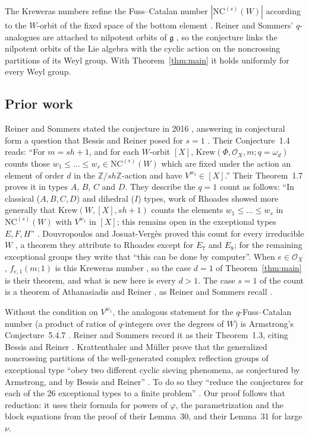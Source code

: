 \documentclass[11pt]{article}
\theoremstyle{definition}
\newcommand{\NC}{\mathrm{NC}}
\newcommand{\Krew}{\mathrm{Krew}}
\newcommand{\Z}{\mathbb{Z}}
\newcommand{\Oc}{\mathcal{O}}
\begin{document}
The Kreweras numbers refine the Fuss--Catalan number $|\NC^{(s)}(W)|$
according to the $W$-orbit of the fixed space of the bottom element
\cite[\S1.1]{RS}. Reiner and Sommers' $q$-analogues are attached to
nilpotent orbits of $\mathfrak g$ \cite[\S1.3]{RS}, so the conjecture links
the nilpotent orbits of the Lie algebra with the cyclic action on the
noncrossing partitions of its Weyl group. With Theorem~\ref{thm:main} it
holds uniformly for every Weyl group.

\subsection{Prior work}

Reiner and Sommers stated the conjecture in 2016 \cite{RS}, answering in
conjectural form a question that Bessis and Reiner posed for $s=1$
\cite[\S6.1, Question~6.3]{BR}. Their Conjecture~1.4 reads: ``For $m=sh+1$, and for each $W$-orbit $[X]$,
$\Krew(\Phi,\Oc_X,m;q=\omega_d)$ counts those $w_1\le\dots\le w_s\in
\NC^{(s)}(W)$ which are fixed under the action an element of order $d$ in
the $\Z/sh\Z$-action and have $V^{w_1}\in[X]$.'' Their Theorem~1.7 proves it
in types $A$, $B$, $C$ and $D$. They describe the $q=1$ count as follows:
``In classical ($A,B,C,D$) and dihedral ($I$) types, work of Rhoades showed
more generally that $\Krew(W,[X],sh+1)$ counts the elements
$w_1\le\dots\le w_s$ in $\NC^{(s)}(W)$ with $V^{w_1}$ in $[X]$; this remains
open in the exceptional types $E,F,H$'' \cite[\S1.1]{RS}. Douvropoulos and
Josuat-Vergès proved this count for every irreducible $W$
\cite[Theorem~3.10]{DJV}, a theorem they attribute to Rhoades \cite{Rho}
except for $E_7$ and $E_8$; for the remaining exceptional groups they write
that ``this can be done by computer''. When $e\in\Oc_X$,
$f_{e,1}(m;1)$ is this Kreweras number \cite[\S1.3]{RS}, so the
case $d=1$ of Theorem~\ref{thm:main} is their theorem, and what is new here
is every $d>1$. The case $s=1$ of the count is a theorem of Athanasiadis
and Reiner \cite[Theorem~6.3]{AR}, as Reiner and Sommers recall
\cite[\S1.1]{RS}.

Without the condition on $V^{w_1}$, the analogous statement for the
$q$-Fuss--Catalan number (a product of ratios of $q$-integers over the
degrees of $W$) is Armstrong's Conjecture~5.4.7 \cite{Arm}. Reiner and
Sommers record it as their Theorem~1.3, citing Bessis and Reiner
\cite{BR} \cite[\S1.2]{RS}. Krattenthaler
and Müller prove that the generalized noncrossing partitions of the
well-generated complex reflection groups of exceptional type ``obey two different cyclic sieving
phenomena, as conjectured by Armstrong, and by Bessis and Reiner''
\cite{KM}. To do so they ``reduce the conjectures for
each of the 26 exceptional types to a finite problem'' \cite[\S1]{KM}. Our
proof follows that reduction: it uses their formula \cite[(5.1)]{KM} for
powers of $\varphi$, the parametrization and the block equations
\cite[(5.8)]{KM} from the proof of their Lemma~30, and their Lemma~31 for
large $\nu$.
\end{document}
